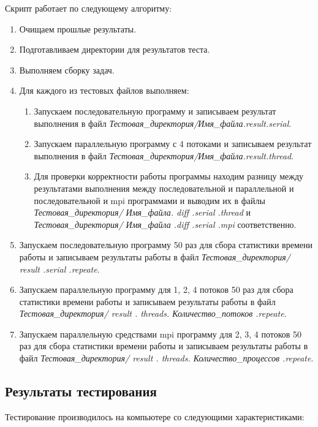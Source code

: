 \documentclass[12pt,a4paper]{report}
\begin{document}
				Скрипт работает по следующему алгоритму:
				\begin{enumerate}
					\item Очищаем прошлые результаты.
					\item Подготавливаем директории для результатов теста.
					\item Выполняем сборку задач.
					\item Для каждого из тестовых файлов выполняем:
						\begin{enumerate}
							\item Запускаем последовательную программу и записываем результат выполнения в файл \textit{Тестовая\_директория/Имя\_файла.result.serial}.
							\item Запускаем параллельную программу с 4 потоками и записываем результат выполнения в файл \textit{Тестовая\_директория/Имя\_файла.result.thread}.
							\item Для проверки корректности работы программы находим разницу между результатами выполнения между последовательной и параллельной и последовательной и mpi программами и выводим их в файлы \textit{Тестовая\_директория/ Имя\_файла. diff .serial .thread} и \textit{Тестовая\_директория/ Имя\_файла .diff .serial .mpi} соответственно.
						\end{enumerate}
					\item Запускаем последовательную программу 50 раз для сбора статистики времени работы и записываем результаты работы в файл \textit{Тестовая\_директория/ result .serial .repeate}.
					\item Запускаем параллельную программу для 1, 2, 4 потоков 50 раз для сбора статистики времени работы и записываем результаты работы в файл \textit{Тестовая\_директория/ result . threads. Количество\_потоков .repeate}.
					\item Запускаем параллельную средствами mpi программу для 2, 3, 4 потоков 50 раз для сбора статистики времени работы и записываем результаты работы в файл \textit{Тестовая\_директория/ result . threads. Количество\_процессов .repeate}.
				\end{enumerate}
			\subsection{Результаты тестирования}
				Тестирование производилось на компьютере со следующими характеристиками:
				
\end{document}
